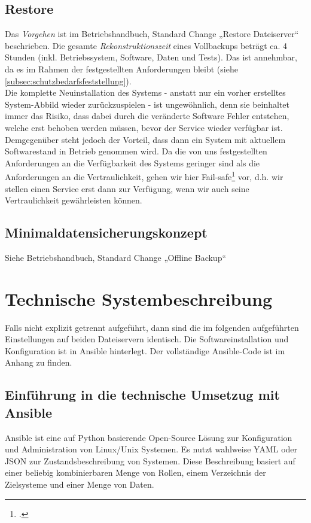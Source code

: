 \subsection{Restore}
\label{subsec:restore}
Das \emph{Vorgehen} ist im Betriebshandbuch, Standard Change „Restore Dateiserver“ beschrieben. Die gesamte \emph{Rekonstruktionszeit} eines Vollbackups beträgt ca. 4 Stunden (inkl. Betriebssystem, Software, Daten und Tests). Das ist annehmbar, da es im Rahmen der festgestellten Anforderungen bleibt (siehe \ref{subsec:schutzbedarfsfeststellung}). \\

Die komplette Neuinstallation des Systems - anstatt nur ein vorher erstelltes System-Abbild wieder zurückzuspielen - ist ungewöhnlich, denn sie beinhaltet immer das Risiko, dass dabei durch die veränderte Software Fehler entstehen, welche erst behoben werden müssen, bevor der Service wieder verfügbar ist. Demgegenüber steht jedoch der Vorteil, dass dann ein System mit aktuellem Softwarestand in Betrieb genommen wird. Da die von uns festgestellten Anforderungen an die Verfügbarkeit des Systems geringer sind als die Anforderungen an die Vertraulichkeit, gehen wir hier Fail-safe\footcite{wikiFailsafe} vor, d.h. wir stellen einen Service erst dann zur Verfügung, wenn wir auch seine Vertraulichkeit gewährleisten können.

\subsection{Minimaldatensicherungskonzept}
Siehe Betriebshandbuch, Standard Change „Offline Backup“

\newpage
\section{Technische Systembeschreibung}
\label{sec:techsys}
Falls nicht explizit getrennt aufgeführt, dann sind die im folgenden aufgeführten Einstellungen auf beiden Dateiservern identisch. Die Softwareinstallation und Konfiguration ist in Ansible hinterlegt. Der vollständige Ansible-Code ist im Anhang zu finden.

\subsection{Einführung in die technische Umsetzug mit Ansible}
\label{subsec:ansiblecode}
Ansible ist eine auf Python basierende Open-Source Lösung zur Konfiguration und Administration von Linux/Unix Systemen. Es nutzt wahlweise YAML oder JSON zur Zustandsbeschreibung von Systemen. Diese Beschreibung basiert auf einer beliebig kombinierbaren Menge von Rollen, einem Verzeichnis der Zielsysteme und einer Menge von Daten.

